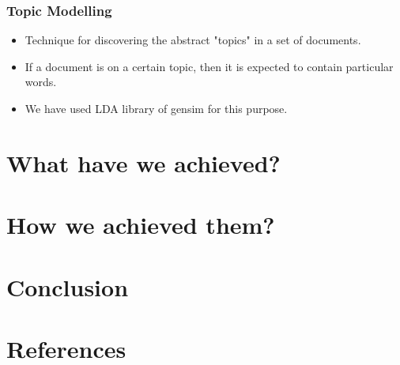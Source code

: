 \documentclass{beamer}
\begin{document}

\begin{frame}
	\frametitle{Topic Modelling}
	\begin{itemize}
		\item Technique for discovering the abstract "topics" in a set of documents.
		\item If a document is on a certain topic, then it is expected to contain particular words.
		\item We have used LDA library of gensim for this purpose.
	\end{itemize}
\end{frame}


\section{What have we achieved?}


\begin{frame}
	\frametitle{}
	
\end{frame}


\section{How we achieved them?}

\section{Conclusion}

\section{References}



\begin{frame}
	\frametitle{}
	
\end{frame}
\end{document}
